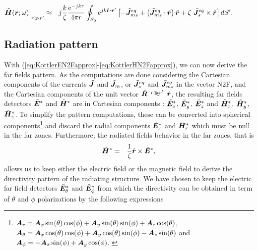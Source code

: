 \begin{eqnarray}
\label{eq:KottlerHN2Fapprox}
\hspace{-1cm} \tilde{\mbfit{H}}(\mbfit{r}; \omega) \Big|_{r \gg r'} &\approx & j \frac{k}{\zeta} \frac{\mrm{e}^{-jk r}}{4\pi r} \oint_{S_0}  \mrm{e}^{jk \hat{\mbfit{r}} \cdot \mbfit{r'}} \left [ - \tilde{\mbfit{J}}_{ms}^{eq}  + \left ( \tilde{\mbfit{J}}_{ms}^{eq} \cdot \hat{\mbfit{r}} \right ) \hat{\mbfit{r}} + \zeta \ \tilde{\mbfit{J}}_{s}^{eq}  \times \hat{\mbfit{r}} \right ]  dS'.
\end{eqnarray}

\subsection{Radiation pattern}

\par With (\ref{eq:KottlerEN2Fapprox}-\ref{eq:KottlerHN2Fapprox}), we can now derive the far fields pattern. As the computations are done considering the Cartesian components of the currents $\tilde{\mbfit{J}}$ and $\tilde{\mbfit{J}}_m$, or $\tilde{\mbfit{J}}_s^{eq}$ and $\tilde{\mbfit{J}}_{ms}^{eq}$ in the vector N2F, and the Cartesian components of the unit vector $\hat{\mbfit{R}} \begin{array}[t]{c}  \approx \\[-15pt] \scriptstyle {r \gg r'}  \end{array} \hat{\mbfit{r}}$, the resulting far fields detectors $\tilde{\mbfit{E}}^{*}$ and $\tilde{\mbfit{H}}^{*}$ are in Cartesian components : $\tilde{\mbfit{E}}_x^{*}$, $\tilde{\mbfit{E}}_y^{*}$, $\tilde{\mbfit{E}}_z^{*}$ and $\tilde{\mbfit{H}}_x^{*}$, $\tilde{\mbfit{H}}_y^{*}$, $\tilde{\mbfit{H}}_z^{*}$. To simplify the pattern computations, these can be converted into spherical components\footnote{$\mbfit{A}_r = \mbfit{A}_x\sin(\theta)\cos(\phi) + \mbfit{A}_y\sin(\theta)\sin(\phi) + \mbfit{A}_z\cos(\theta)$, $\mbfit{A}_\theta = \mbfit{A}_x\cos(\theta)\cos(\phi) + \mbfit{A}_y\cos(\theta)\sin(\phi) - \mbfit{A}_z\sin(\theta)$ and $\mbfit{A}_\phi = -\mbfit{A}_x\sin(\phi) + \mbfit{A}_y\cos(\phi)$. \cite{BalanisAT} \label{fn:cart2sph}} and discard the radial components $\tilde{\mbfit{E}}_r^{*}$ and $\tilde{\mbfit{H}}_r^{*}$ which must be null in the far zones. Furthermore, the radiated fields behavior in the far zones, that is
\begin{eqnarray}
\tilde{\mbfit{H}}^* &= & \frac{1}{\zeta} \hat{\mbfit{r}} \times \tilde{\mbfit{E}}^*,
\end{eqnarray} allows us to keep either the electric field or the magnetic field to derive the directivity pattern of the radiating structure. We have chosen to keep the electric far field detectors $\tilde{\mbfit{E}}_\theta^{*}$ and $\tilde{\mbfit{E}}_\phi^{*}$ from which the directivity can be obtained in term of $\theta$ and $\phi$ polarizations by the following expressions \cite{MilliganMAD, RothwellCloudE}
